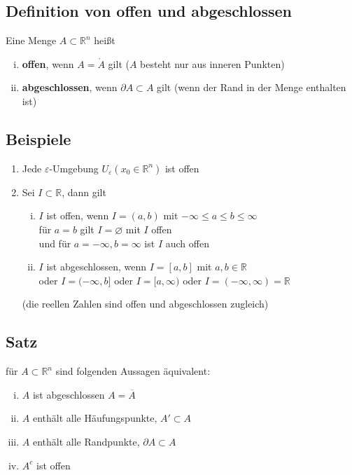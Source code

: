 \documentclass[11pt,a4paper]{book}
\newcommand {\R}	{\mathbb{R}}
\newcommand {\Rn}	{\mathbb{R}^n}
\newcommand{\1}    	{\mathbbm{1}}
\begin{document}
\subsection{Definition von offen und abgeschlossen}
Eine Menge \(A \subset \Rn\) heißt
\begin{enumerate}[(i)]
	\item \textbf{offen}, wenn \(A = \mathring{A} \) gilt (\(A\) besteht nur aus inneren Punkten)
	\item \textbf{abgeschlossen}, wenn \(\partial A \subset A \) gilt (wenn der Rand in der Menge enthalten ist)
\end{enumerate}

\subsection{Beispiele}
\begin{enumerate}[1.~]
	\item Jede \(\varepsilon\)-Umgebung \(U_\varepsilon(x_0 \in \Rn)\) ist offen
	\item Sei \(I \subset \R\), dann gilt
	\begin{enumerate}[(i)]
		\item \(I\) ist offen, wenn \(I = (a,b)\) mit \( -\infty \leqslant a \leqslant b \leqslant \infty \) \\
		für \(a = b\) gilt \(I = \varnothing\) mit \(I\) offen \\
		und für \(a = -\infty, b = \infty\) ist \(I\) auch offen
		\item \(I\) ist abgeschlossen, wenn \(I = [a,b]\) mit \(a,b \in \R\) \\
		oder \(I = (-\infty, b]\) oder \(I = [a, \infty) \) oder \(I = (-\infty, \infty) = \R\)
	\end{enumerate}
	(die reellen Zahlen sind offen und abgeschlossen zugleich)
\end{enumerate}

\subsection{Satz}
für \(A \subset \Rn\) sind folgenden Aussagen äquivalent:
\begin{enumerate}[(i)]
	\item \(A\) ist abgeschlossen \(A = \overline{A}\)
	\item \(A\) enthält alle Häufungspunkte, \(A' \subset A\)
	\item \(A\) enthält alle Randpunkte, \(\partial A \subset A\)
	\item \(A^c\) ist offen
\end{enumerate}
\end{document}
